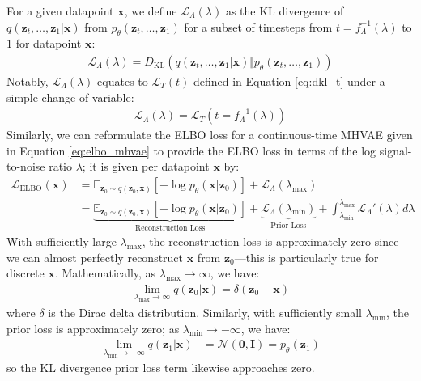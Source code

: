 \documentclass[ oneside,%
                    author={George Herbert},
                    degree={MSci},
                     title={Video Diffusion Models for Climate Simulations},
                  subtitle={}]{dissertation}
\begin{document}
For a given datapoint $\mathbf{x}$, we define $\mathcal{L}_\Lambda(\lambda)$ as the KL divergence of $q(\mathbf{z}_t,\ldots,\mathbf{z}_1|\mathbf{x})$ from $p_\theta(\mathbf{z}_t,\ldots,\mathbf{z}_1)$ for a subset of timesteps from $t=f_\Lambda^{-1}(\lambda)$ to $1$ for datapoint $\mathbf{x}$:
\begin{align}
      \mathcal{L}_\Lambda(\lambda)=D_{\mathrm{KL}}(q(\mathbf{z}_t,\ldots,\mathbf{z}_1|\mathbf{x})\Vert p_\theta(\mathbf{z}_t,\ldots,\mathbf{z}_1))
\end{align}
Notably, $\mathcal{L}_\Lambda(\lambda)$ equates to $\mathcal{L}_T(t)$ defined in Equation \ref{eq:dkl_t} under a simple change of variable:
\begin{align}
      \mathcal{L}_\Lambda(\lambda)=\mathcal{L}_T(t=f_\Lambda^{-1}(\lambda))
\end{align}
Similarly, we can reformulate the ELBO loss for a continuous-time MHVAE given in Equation \ref{eq:elbo_mhvae} to provide the ELBO loss in terms of the log signal-to-noise ratio $\lambda$; it is given per datapoint $\mathbf{x}$ by:
\begin{align}
      \mathcal{L}_{\mathrm{ELBO}}(\mathbf{x})&=\mathbb{E}_{\mathbf{z}_0\sim q(\mathbf{z}_0,\mathbf{x})}\left[-\log p_\theta(\mathbf{x}|\mathbf{z}_0)\right]+\mathcal{L}_\Lambda(\lambda_{\max})\\
      &=\underbrace{\mathbb{E}_{\mathbf{z}_0\sim q(\mathbf{z}_0,\mathbf{x})}\left[-\log p_\theta(\mathbf{x}|\mathbf{z}_0)\right]}_{\text{Reconstruction Loss}}+\underbrace{\mathcal{L}_\Lambda(\lambda_{\min})}_{\text{Prior Loss}}+\int_{\lambda_{\min}}^{\lambda_{\max}}\mathcal{L}_\Lambda'(\lambda)d\lambda\label{eq:diffusion_elbo}
\end{align}
With sufficiently large $\lambda_{\max}$, the reconstruction loss is approximately zero since we can almost perfectly reconstruct $\mathbf{x}$ from $\mathbf{z}_0$---this is particularly true for discrete $\mathbf{x}$. Mathematically, as $\lambda_{\max}\to\infty$, we have:
\begin{align}
      \lim_{\lambda_{\max}\to\infty}q(\mathbf{z}_0|\mathbf{x})=\delta(\mathbf{z}_0-\mathbf{x})
\end{align}
where $\delta$ is the Dirac delta distribution. Similarly, with sufficiently small $\lambda_{\min}$, the prior loss is approximately zero; as $\lambda_{\min}\to-\infty$, we have:
\begin{align}
      \lim_{\lambda_{\min}\to -\infty} q(\mathbf{z}_1|\mathbf{x})&=\mathcal{N}(\mathbf{0}, \mathbf{I})=p_\theta(\mathbf{z}_1)
\end{align}
so the KL divergence prior loss term likewise approaches zero.
\end{document}
